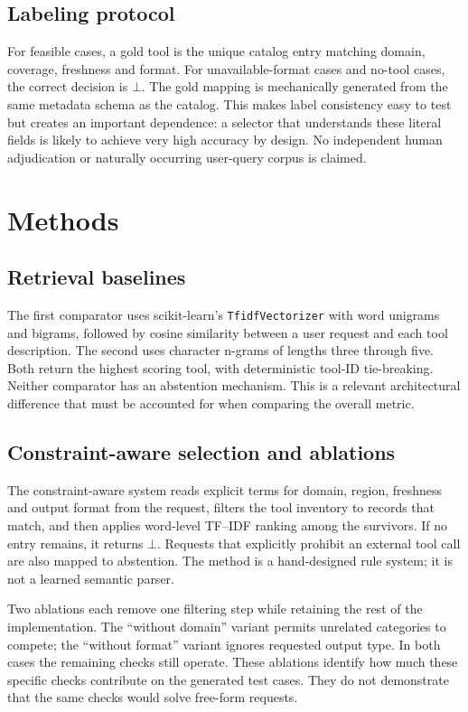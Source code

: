 \documentclass[10pt,a4paper]{article}
\begin{document}
\subsection{Labeling protocol}
For feasible cases, a gold tool is the unique catalog entry matching domain, coverage, freshness and format. For unavailable-format cases and no-tool cases, the correct decision is $\bot$. The gold mapping is mechanically generated from the same metadata schema as the catalog. This makes label consistency easy to test but creates an important dependence: a selector that understands these literal fields is likely to achieve very high accuracy by design. No independent human adjudication or naturally occurring user-query corpus is claimed.

\section{Methods}
\subsection{Retrieval baselines}
The first comparator uses scikit-learn's \texttt{TfidfVectorizer} with word unigrams and bigrams, followed by cosine similarity between a user request and each tool description. The second uses character n-grams of lengths three through five. Both return the highest scoring tool, with deterministic tool-ID tie-breaking. Neither comparator has an abstention mechanism. This is a relevant architectural difference that must be accounted for when comparing the overall metric.

\subsection{Constraint-aware selection and ablations}
The constraint-aware system reads explicit terms for domain, region, freshness and output format from the request, filters the tool inventory to records that match, and then applies word-level TF--IDF ranking among the survivors. If no entry remains, it returns $\bot$. Requests that explicitly prohibit an external tool call are also mapped to abstention. The method is a hand-designed rule system; it is not a learned semantic parser.

Two ablations each remove one filtering step while retaining the rest of the implementation. The ``without domain'' variant permits unrelated categories to compete; the ``without format'' variant ignores requested output type. In both cases the remaining checks still operate. These ablations identify how much these specific checks contribute on the generated test cases. They do not demonstrate that the same checks would solve free-form requests.
\end{document}
